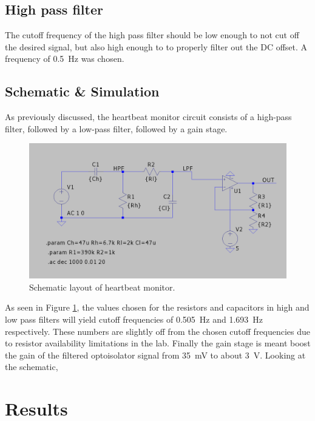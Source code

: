 \documentclass[CMPE]{../KGCOEReport}
\begin{document}
	\subsection*{High pass filter}
	The cutoff frequency of the high pass filter should be low enough to not cut
	off the desired signal, but also high enough to to properly filter out the DC offset.
	A frequency of \SI{0.5}{\hertz} was chosen.

	\pagebreak

	\subsection*{Schematic \& Simulation}

	As previously discussed, the heartbeat monitor circuit consists of a high-pass filter,
	followed by a low-pass filter, followed by a gain stage.

	\begin{figure}[h!]
        \centering
        \includegraphics[width=12cm]{schematic}
        \caption{Schematic layout of heartbeat monitor.}
        \label{fig:schematic}
	\end{figure}

	As seen in Figure \ref{fig:schematic}, the values chosen for the resistors and
	capacitors in high and low pass filters will yield cutoff frequencies of
	\SI{.505}{\hertz} and \SI{1.693}{\hertz} respectively.
	These numbers are slightly off from the chosen cutoff frequencies due to resistor
	availability limitations in the lab. Finally the gain stage is meant boost the
	gain of the filtered optoisolator signal from \SI{35}{\milli\volt} to about
	\SI{3}{\volt}. Looking at the schematic, 

    \section*{Results}
\end{document}
